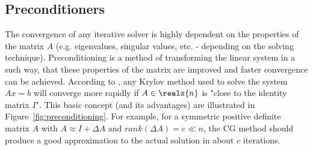 \subsection{Preconditioners}
\label{sec:preconditioners}
The convergence of any iterative solver is highly dependent on the properties of the matrix $A$ (e.g. eigenvalues, singular values, etc. - depending on the solving technique). Preconditioning is a method of transforming the linear system in a such way, that these properties of the matrix are improved and faster convergence can be achieved. According to \cite{golub_matrix_2013}, any Krylov method used to solve the system $Ax=b$ will converge more rapidly if $A \in \realx{n}$ is "close to the identity matrix $I$". This basic concept (and its advantages) are illustrated in Figure~\hyperref[fig:preconditioning]{\ref{fig:preconditioning}}. For example, for a symmetric positive definite matrix $A$ with $A \approx I +\Delta A$ and $rank(\Delta A)=c \ll n$, the CG method should produce a good approximation to the actual solution in about $c$ iterations.

